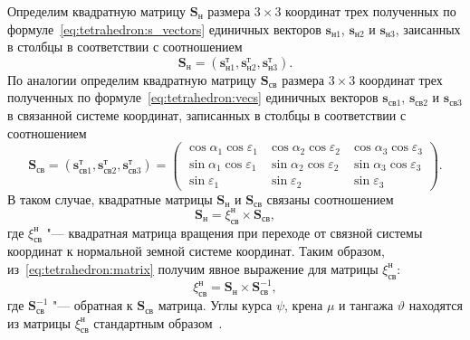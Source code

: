 \documentclass[../main.tex]{subfiles}
\begin{document}
Определим квадратную матрицу $\mathbf{S}_{\text{н}}$ размера $3 \times 3$ координат трех полученных по формуле~\eqref{eq:tetrahedron:s_vectors} единичных векторов $\mathbf{s}_{\text{н}1}$, $\mathbf{s}_{\text{н}2}$ и $\mathbf{s}_{\text{н}3}$, заисанных в столбцы в соответствии с соотношением
\begin{equation*}
    \mathbf{S}_{\text{н}} = \left(\mathbf{s}_{\text{н}1}^\text{т}, \mathbf{s}_{\text{н}2}^\text{т}, \mathbf{s}_{\text{н}3}^\text{т}\right).
\end{equation*}
По аналогии определим квадратную матрицу $\mathbf{S}_{\text{св}}$ размера $3 \times 3$ координат трех полученных по формуле~\eqref{eq:tetrahedron:vecs} единичных векторов $\mathbf{s}_{\text{св}1}$, $\mathbf{s}_{\text{св}2}$ и $\mathbf{s}_{\text{св}3}$ в связанной системе координат, записанных в столбцы в соответствии с соотношением
\begin{equation*}
    \mathbf{S}_{\text{св}} = \left(\mathbf{s}_{\text{св}1}^\text{т}, \mathbf{s}_{\text{св}2}^\text{т}, \mathbf{s}_{\text{св}3}^\text{т}\right) =
    \left(\begin{matrix}
      \cos\alpha_1\cos\varepsilon_1 & \cos\alpha_2\cos\varepsilon_2 & \cos\alpha_3 \cos\varepsilon_3 \\
      \sin\alpha_1\cos\varepsilon_1 & \sin\alpha_2\cos\varepsilon_2 & \sin\alpha_3 \cos\varepsilon_3 \\
      \sin\varepsilon_1 & \sin\varepsilon_2 & \sin\varepsilon_3
    \end{matrix}\right).
\end{equation*}
В таком случае, квадратные матрицы $\mathbf{S}_{\text{н}}$ и $\mathbf{S}_{\text{св}}$ связаны соотношением
\begin{equation}\label{eq:tetrahedron:matrix}
    \mathbf{S}_{\text{н}} = \xi_{\text{св}}^{\text{н}} \times \mathbf{S}_{\text{св}},
\end{equation}
где $\xi_{\text{св}}^{\text{н}}$ "--- квадратная матрица вращения при переходе от связной системы координат к нормальной земной системе координат. Таким образом, из~\eqref{eq:tetrahedron:matrix} получим явное выражение для матрицы $\xi_{\text{св}}^{\text{н}}$:
\begin{equation*}
    \xi_{\text{св}}^{\text{н}} = \mathbf{S}_{\text{н}} \times \mathbf{S}_{\text{св}}^{-1},
\end{equation*}
где $\mathbf{S}_{\text{св}}^{-1}$ "--- обратная к $\mathbf{S}_{\text{св}}$ матрица. Углы курса $\psi$, крена $\mu$ и тангажа $\vartheta$ находятся из матрицы $\xi_{\text{св}}^{\text{н}}$ стандартным образом~\cite{KOSTRIKIN:2008,ILIYN:2007}.
\end{document}

